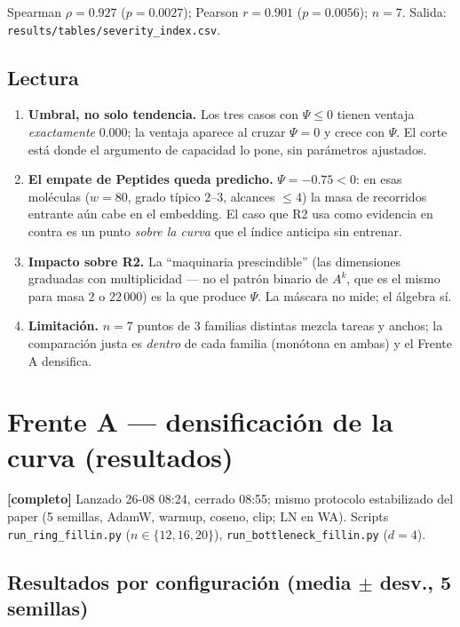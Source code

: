 \documentclass[11pt]{article}
\newcommand{\estado}[1]{\textcolor{blue!60!black}{\textbf{[#1]}}}
\begin{document}
Spearman $\rho=0.927$ ($p=0.0027$); Pearson $r=0.901$ ($p=0.0056$); $n=7$.
Salida: \texttt{results/tables/severity\_index.csv}.

\subsection{Lectura}

\begin{enumerate}
  \item \textbf{Umbral, no solo tendencia.} Los tres casos con $\Psi\le0$
  tienen ventaja \emph{exactamente} $0.000$; la ventaja aparece al cruzar
  $\Psi=0$ y crece con $\Psi$. El corte est\'a donde el argumento de
  capacidad lo pone, sin par\'ametros ajustados.
  \item \textbf{El empate de Peptides queda predicho.} $\Psi=-0.75<0$: en
  esas mol\'eculas ($w{=}80$, grado t\'ipico $2$--$3$, alcances $\le4$) la
  masa de recorridos entrante a\'un cabe en el embedding. El caso que R2 usa
  como evidencia en contra es un punto \emph{sobre la curva} que el \'indice
  anticipa sin entrenar.
  \item \textbf{Impacto sobre R2.} La ``maquinaria prescindible'' (las
  dimensiones graduadas con multiplicidad --- no el patr\'on binario de
  $A^k$, que es el mismo para masa $2$ o $22\,000$) es la que produce
  $\Psi$. La m\'ascara no mide; el \'algebra s\'i.
  \item \textbf{Limitaci\'on.} $n=7$ puntos de 3 familias distintas mezcla
  tareas y anchos; la comparaci\'on justa es \emph{dentro} de cada familia
  (mon\'otona en ambas) y el Frente A densifica.
\end{enumerate}

\section{Frente A --- densificaci\'on de la curva (resultados)}

\estado{completo} Lanzado 26-08 08:24, cerrado 08:55; mismo protocolo
estabilizado del paper (5 semillas, AdamW, warmup, coseno, clip; LN en WA).
Scripts \texttt{run\_ring\_fillin.py} ($n\in\{12,16,20\}$),
\texttt{run\_bottleneck\_fillin.py} ($d{=}4$).

\subsection{Resultados por configuraci\'on (media $\pm$ desv., 5 semillas)}
\end{document}
